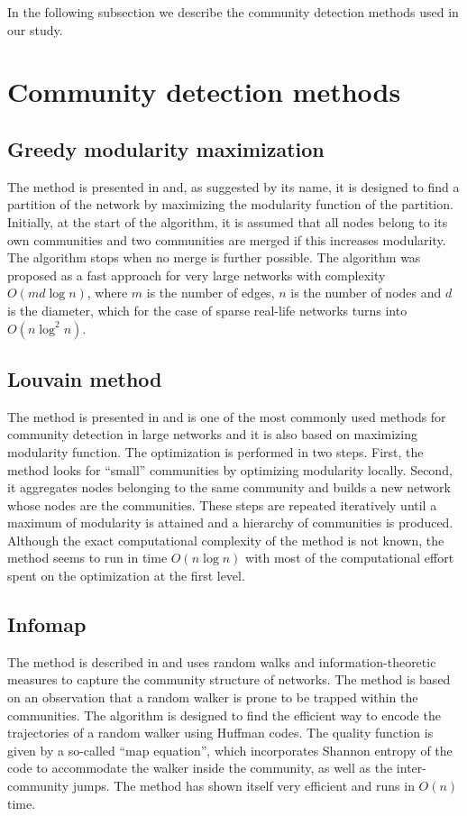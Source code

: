 In the following subsection we describe the community detection methods used in our study.

\section{Community detection methods}

\subsection{Greedy modularity maximization}
The method is presented in \cite{Clauset2004} and, as suggested by its name, it is designed to find a partition of the network by maximizing the modularity function of the partition. Initially, at the start of the algorithm, it is assumed that all nodes belong to its own communities and two communities are merged if this increases modularity. The algorithm stops when no merge is further possible. The algorithm was proposed as a fast approach for very large networks with complexity $O(md\log n)$, where $m$ is the number of edges, $n$ is the number of nodes and $d$ is the diameter, which for the case of sparse real-life networks turns into $O(n \log^2 n)$.

\subsection{Louvain method}
The method is presented in \cite{Blondel2008} and is one of the most commonly used methods for community detection in large networks and it is also based on maximizing modularity function. The optimization is performed in two steps. First, the method looks for ``small'' communities by optimizing modularity locally. Second, it aggregates nodes belonging to the same community and builds a new network whose nodes are the communities. These steps are repeated iteratively until a maximum of modularity is attained and a hierarchy of communities is produced. Although the exact computational complexity of the method is not known, the method seems to run in time $O(n \log n)$ with most of the computational effort spent on the optimization at the first level.

\subsection{Infomap}
The method is described in \cite{Rosvall2008} and uses random walks and information-theoretic measures to capture the community structure of networks. The method is based on an observation that a random walker is prone to be trapped within the communities. The algorithm is designed to find the efficient way to encode the trajectories of a random walker using Huffman codes. The quality function is given by a so-called ``map equation'', which incorporates Shannon entropy of the code to accommodate the walker inside the community, as well as the inter-community jumps. The method has shown itself very efficient and runs in $O(n)$ time.

